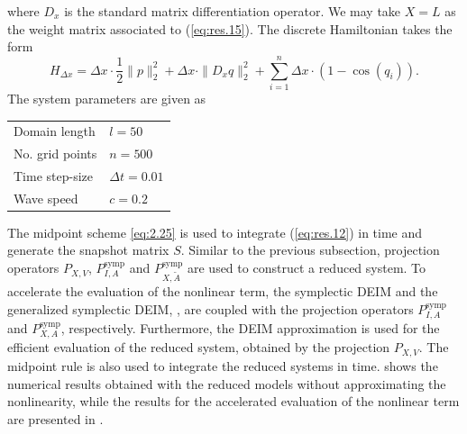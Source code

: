where $D_x$ is the standard matrix differentiation operator. We may take $X = L$ as the weight matrix associated to (\ref{eq:res.15}). The discrete Hamiltonian takes the form
\begin{equation} \label{eq:res.17}
	H_{\Delta x} = \Delta x \cdot \frac 1 2 \| p \|^2_2 + \Delta x \cdot \| D_x q \|^2_2 + \sum_{i=1}^{n} \Delta x \cdot ( 1 - \cos(q_i) ).
\end{equation}
The system parameters are given as
\vspace{0.5cm}
\begin{center}
\begin{tabular}{|l|l|}
\hline
Domain length & $l = 50$ \\
No. grid points & $n = 500$ \\
Time step-size & $\Delta t = 0.01$ \\
Wave speed & $c=0.2$ \\
\hline
\end{tabular}
\end{center}
\vspace{0.5cm}
The midpoint scheme \eqref{eq:2.25} is used to integrate (\ref{eq:res.12}) in time and generate the snapshot matrix $S$. Similar to the previous subsection, projection operators $P_{X,V}$, $P^{\text{symp}}_{I,A}$ and $P^{\text{symp}}_{X,\tilde A}$ are used to construct a reduced system. To accelerate the evaluation of the nonlinear term, the symplectic DEIM and the generalized symplectic DEIM, , are coupled with the projection operators $P^{\text{symp}}_{I,A}$ and $P^{\text{symp}}_{X,A}$, respectively. Furthermore, the DEIM approximation is used for the efficient evaluation of the reduced system, obtained by the projection $P_{X,V}$. The midpoint rule is also used to integrate the reduced systems in time.  shows the numerical results obtained with the reduced models without approximating the nonlinearity, while the results for the accelerated evaluation of the nonlinear term are presented in .

